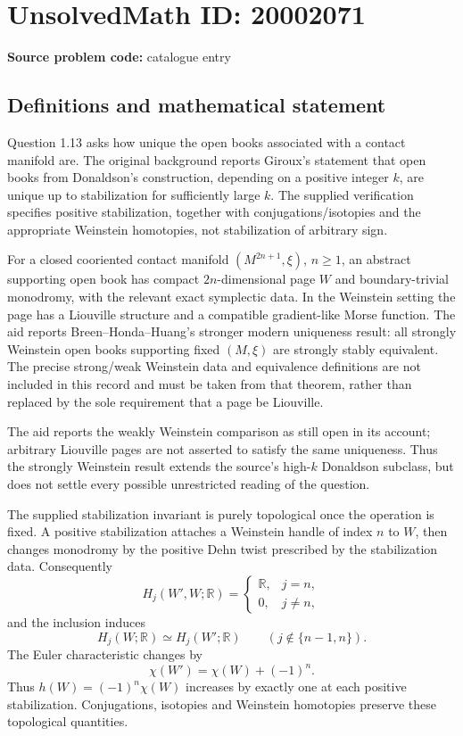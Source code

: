 \documentclass[11pt]{article}
\newcommand{\R}{\mathbb{R}}
\begin{document}
\section*{UnsolvedMath ID: 20002071}
\textbf{Source problem code:} catalogue entry
\subsection{Definitions and mathematical statement}
Question 1.13 asks how unique the open books associated with a contact manifold are. The original background reports Giroux's statement that open books from Donaldson's construction, depending on a positive integer \(k\), are unique up to stabilization for sufficiently large \(k\). The supplied verification specifies positive stabilization, together with conjugations/isotopies and the appropriate Weinstein homotopies, not stabilization of arbitrary sign.

For a closed cooriented contact manifold \((M^{2n+1},\xi)\), \(n\geq1\), an abstract supporting open book has compact \(2n\)-dimensional page \(W\) and boundary-trivial monodromy, with the relevant exact symplectic data. In the Weinstein setting the page has a Liouville structure and a compatible gradient-like Morse function. The aid reports Breen--Honda--Huang's stronger modern uniqueness result: all strongly Weinstein open books supporting fixed \((M,\xi)\) are strongly stably equivalent. The precise strong/weak Weinstein data and equivalence definitions are not included in this record and must be taken from that theorem, rather than replaced by the sole requirement that a page be Liouville.

The aid reports the weakly Weinstein comparison as still open in its account; arbitrary Liouville pages are not asserted to satisfy the same uniqueness. Thus the strongly Weinstein result extends the source's high-\(k\) Donaldson subclass, but does not settle every possible unrestricted reading of the question.

The supplied stabilization invariant is purely topological once the operation is fixed. A positive stabilization attaches a Weinstein handle of index \(n\) to \(W\), then changes monodromy by the positive Dehn twist prescribed by the stabilization data. Consequently
\[
 H_j(W',W;\R)=\begin{cases}\R,&j=n,\\0,&j\ne n,\end{cases}
\]
and the inclusion induces
\[
 H_j(W;\R)\simeq H_j(W';\R)
 \qquad(j\notin\{n-1,n\}).
\]
The Euler characteristic changes by
\[
 \chi(W')=\chi(W)+(-1)^n.
\]
Thus \(h(W)=(-1)^n\chi(W)\) increases by exactly one at each positive stabilization. Conjugations, isotopies and Weinstein homotopies preserve these topological quantities.
\end{document}
